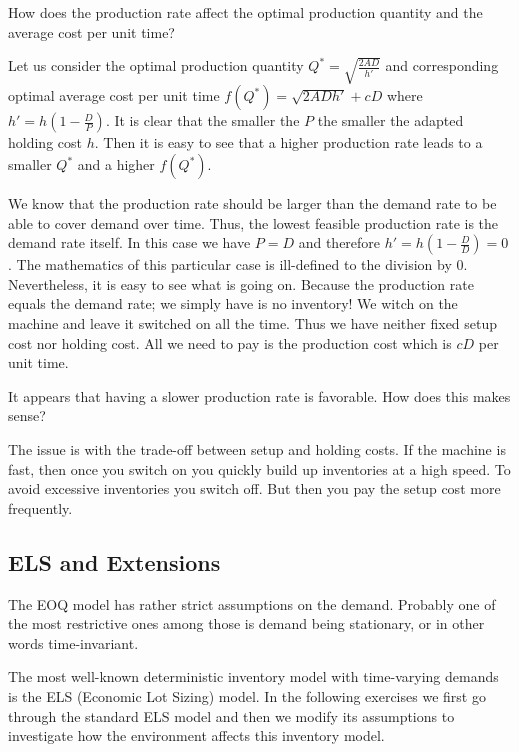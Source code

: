 \begin{question}
How does the production rate affect the optimal production quantity and the average cost per unit time?
\end{question}

\begin{solution}
Let us consider the optimal production quantity $Q^*=\sqrt{\frac{2AD}{h'}}$ and corresponding optimal average cost per unit time $f(Q^*)=\sqrt{2ADh'}+cD$ where $h'=h\left(1-\frac{D}{P}\right)$. It is clear that the smaller the $P$ the smaller the adapted holding cost $h$. Then it is easy to see that a higher production rate leads to a smaller $Q^*$ and a higher $f(Q^*)$. 

We know that the production rate should be larger than the demand rate to be able to cover demand over time. Thus, the lowest feasible production rate is the demand rate itself. In this case we have $P=D$ and therefore $h'=h\left(1-\frac{D}{D}\right)=0$. The mathematics of this particular case is ill-defined to the division by 0. Nevertheless, it is easy to see what is going on. Because the production rate equals the demand rate; we simply have is no inventory! We witch on the machine and leave it switched on all the time. Thus we have neither fixed setup cost nor holding cost. All we need to pay is the production cost which is $cD$ per unit time.
\end{solution}

\begin{question}
It appears that having a slower production rate is favorable. How does this makes sense?
\end{question}
\begin{solution}
The issue is with the trade-off between setup and holding costs. If the machine is fast, then once you switch on you quickly build up inventories at a high speed. To avoid excessive inventories you switch off. But then you pay the setup cost more frequently. 
\end{solution}


\subsection{ELS and Extensions}

The EOQ model has rather strict assumptions on the demand. Probably one of the most restrictive ones among those is demand being stationary, or in other words time-invariant.

The most well-known deterministic inventory model with time-varying demands is the ELS (Economic Lot Sizing) model. In the following exercises we first go through the standard ELS model and then we modify its assumptions to investigate how the environment affects this inventory model. 

